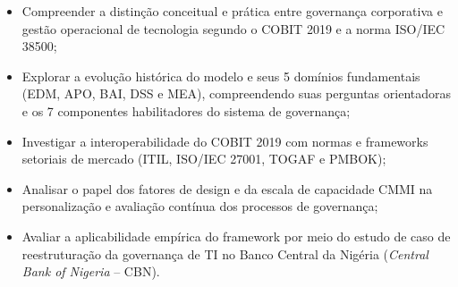 \begin{itemize}
    \item Compreender a distinção conceitual e prática entre governança corporativa e gestão operacional de tecnologia segundo o COBIT 2019 e a norma ISO/IEC 38500;
    \item Explorar a evolução histórica do modelo e seus 5 domínios fundamentais (EDM, APO, BAI, DSS e MEA), compreendendo suas perguntas orientadoras e os 7 componentes habilitadores do sistema de governança;
    \item Investigar a interoperabilidade do COBIT 2019 com normas e frameworks setoriais de mercado (ITIL, ISO/IEC 27001, TOGAF e PMBOK);
    \item Analisar o papel dos fatores de design e da escala de capacidade CMMI na personalização e avaliação contínua dos processos de governança;
    \item Avaliar a aplicabilidade empírica do framework por meio do estudo de caso de reestruturação da governança de TI no Banco Central da Nigéria (\textit{Central Bank of Nigeria} -- CBN).
\end{itemize}

